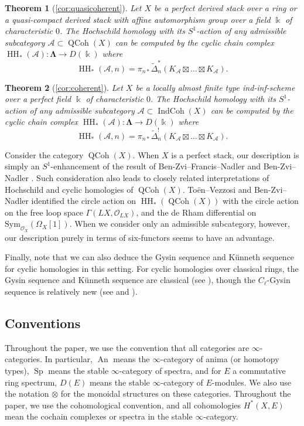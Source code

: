 \documentclass[11pt]{amsart}
\numberwithin{equation}{section}
\theoremstyle{plain}
\newtheorem{Thm}{Theorem}[section]
\theoremstyle{definition}
\theoremstyle{remark}
\newcommand{\cA} { {\mathcal{A}}}
\newcommand{\cO} { {\mathcal{O}}}
\newcommand\HH{\operatorname{HH}}
\newcommand\Sp{ {\operatorname{Sp} } }
\newcommand\An{ {\operatorname{An} } }
\newcommand\IndCoh{\operatorname{IndCoh}}
\newcommand\QCoh{\operatorname{QCoh}}
\begin{document}
\begin{Thm}[\autoref{cor:quasicoherent}]
    Let $X$ be a perfect derived stack over a ring or a quasi-compact derived stack with affine automorphism group over a field $\Bbbk$  of characteristic $0$. The Hochschild homology with its $S^1$-action of any admissible subcategory $\cA \subset \QCoh(X)$ can be computed by the cyclic chain complex $\HH_*(\cA): \boldsymbol{\Lambda} \to D(\Bbbk)$ where
    \[\HH_*(\cA, n) = \pi_{n*}\widetilde{\Delta}_n^*(K_\cA \boxtimes \dots \boxtimes K_\cA).\]
\end{Thm}

\begin{Thm}[\autoref{cor:coherent}]
    Let $X$ be  a locally almost finite type ind-inf-scheme over a perfect field $\Bbbk$  of characteristic $0$. The Hochschild homology with its $S^1$-action of any admissible subcategory $\cA \subset \IndCoh(X)$ can be computed by the cyclic chain complex $\HH_*(\cA): \boldsymbol{\Lambda} \to D(\Bbbk)$ where
    \[\HH_*(\cA, n) = \pi_{n*}\widetilde{\Delta}_n^!(K_\cA \boxtimes \dots \boxtimes K_\cA).\]
\end{Thm}

Consider the category $\QCoh(X)$. When $X$ is a perfect stack, our description is simply an $S^1$-enhancement of the result of Ben-Zvi--Francis--Nadler \cite[Corollary 4.12]{Ben-Zvi-Francis-Nadler} and Ben-Zvi--Nadler \cite{Ben-Zvi-Nadler-trace}. Such consideration also leads to closely related interpretations of Hochschild and cyclic homologies of $\QCoh(X)$. To\"en--Vezzosi and Ben-Zvi--Nadler \cite{Ben-Zvi-Nadler-looplanglands,Ben-Zvi-Nadlerloopspaceandconnection,toen_vezzosi_2011,toen_vezzosi_15} identified the circle action on $\HH_*(\QCoh(X))$ with the circle action on the free loop space $\Gamma({L}X, \cO_{{L}X})$, and the de Rham differential on $\mathrm{Sym}_{\cO_X}(\Omega_X[1])$. When we consider only an admissible subcategory, however, our description purely in terms of six-functors seems to have an advantage.

Finally, note that we can also deduce the Gysin sequence and K\"unneth sequence for cyclic homologies in this setting. For cyclic homologies over classical rings, the Gysin sequence and K\"unneth sequence are classical (see \cite[Section 2.2 \& 4.3]{LodayCyclic}), though the $C_\ell$-Gysin sequence is relatively new (see \cite[Lecture 7]{Kaledin} and \cite[Section 5]{Chen1}).

\subsection*{Conventions}
Throughout the paper, we use the convention that all categories are $\infty$-categories. In particular, $\An$ means the $\infty$-category of anima (or homotopy types), $\Sp$ means the stable $\infty$-category of spectra, and for $E$ a commutative ring spectrum, $D(E)$ means the stable $\infty$-category of $E$-modules.  We also use the notation $\otimes$ for the monoidal structures on these categories. Throughout the paper, we use the cohomological convention, and all cohomologies $H^*(X, E)$ mean the cochain complexes or spectra in the stable $\infty$-category.
\end{document}
